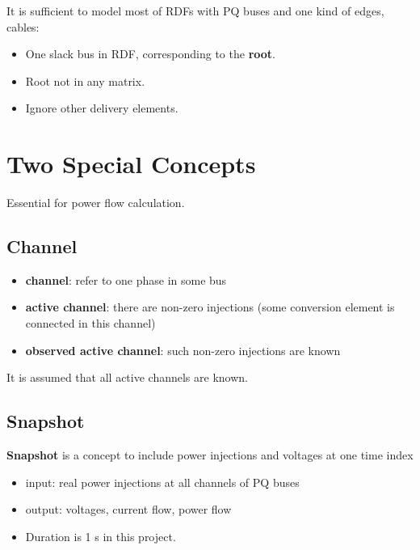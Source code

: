\documentclass[
]{book}
\providecommand{\tightlist}{%
  \setlength{\itemsep}{0pt}\setlength{\parskip}{0pt}}
\begin{document}
It is sufficient to model most of RDFs with PQ buses and one kind of edges,
cables:

\begin{itemize}
\tightlist
\item
  One slack bus in RDF, corresponding to the \textbf{root}.
\item
  Root not in any matrix.
\item
  Ignore other delivery elements.
\end{itemize}

\hypertarget{two-special-concepts}{%
\section{Two Special Concepts}\label{two-special-concepts}}

Essential for power flow calculation.

\hypertarget{channel}{%
\subsection*{Channel}\label{channel}}

\begin{itemize}
\tightlist
\item
  \textbf{channel}: refer to one phase in some bus
\item
  \textbf{active channel}: there are non-zero injections (some conversion element is
  connected in this channel)
\item
  \textbf{observed active channel}: such non-zero injections are known
\end{itemize}

It is assumed that all active channels are known.

\hypertarget{snapshot}{%
\subsection*{Snapshot}\label{snapshot}}

\textbf{Snapshot} is a concept to include power injections and voltages at one time
index

\begin{itemize}
\tightlist
\item
  input: real power injections at all channels of PQ buses
\item
  output: voltages, current flow, power flow
\item
  Duration is 1 s in this project.
\end{itemize}
\end{document}
